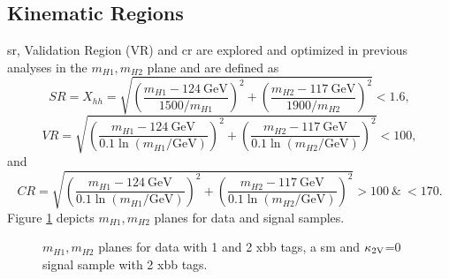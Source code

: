 \subsection{Kinematic Regions}\label{sec:kinematic_regions}
\ac{sr}, Validation Region (VR) and \ac{cr} are explored and optimized in previous analyses \citep{aad2023search,ATL-COM-PHYS-2023-033} in the $m_{H1},m_{H2}$ plane and are defined as
\begin{equation}
    SR=X_{hh} =  \sqrt{\left(\frac{m_{H1} - \SI{124}{\GeV}}{1500 / m_{H1}}\right)^{2} + \left(\frac{m_{H2} - \SI{117}{\GeV}}{1900 / m_{H2}}\right)^{2}} < 1.6,
\end{equation}
\begin{equation}
    \label{VR_Xhh}
    VR =  \sqrt{\left(\frac{m_{H1} - \SI{124}{\GeV}}{0.1 \ln(m_{H1}/\text{GeV})}\right)^{2} + \left(\frac{m_{H2} - \SI{117}{\GeV}}{0.1 \ln(m_{H2}/\text{GeV})}\right)^{2}} < 100,
\end{equation}
and
\begin{equation}
    \label{CR_Xhh}
    CR = \sqrt{\left(\frac{m_{H1} - \SI{124}{\GeV}}{0.1 \ln(m_{H1}/\text{GeV})}\right)^{2} + \left(\frac{m_{H2} - \SI{117}{\GeV}}{0.1 \ln(m_{H2}/\text{GeV})}\right)^{2}} > 100  \ \& \ < 170.
\end{equation}
Figure \ref{fig:m_hh_plane} depicts $m_{H1},m_{H2}$ planes for data and signal samples.
\begin{figure}
    \centering
    \caption[]{ $m_{H1},m_{H2}$ planes for data with 1 and 2 xbb tags, a \ac{sm} and $\kappa_{\text{2V}}$=0 signal sample with 2 xbb tags.}
    \label{fig:m_hh_plane}
\end{figure}


